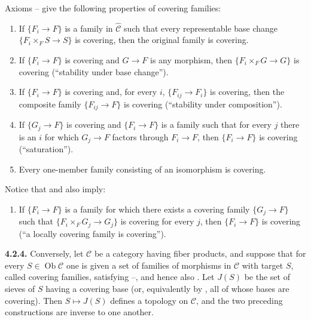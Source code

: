 Axioms -- give the following properties of covering
families:
\begin{enumerate}
 \item[(C 0)] If \(\{F_i\to F\}\) is a family in
 \(\widehat{\mathscr C}\) such that every representable base change
 \(\{F_i\times_FS\to S\}\) is covering, then the original family is
 covering.
 \item[(C 1)] If \(\{F_i\to F\}\) is covering and \(G\to F\) is any
 morphism, then \(\{F_i\times_FG\to G\}\) is covering (``stability under
 base change'').
 \item[(C 2)] If \(\{F_i\to F\}\) is covering and, for every \(i\),
 \(\{F_{ij}\to F_i\}\) is covering, then the composite family
 \(\{F_{ij}\to F\}\) is covering (``stability under composition'').
 \item[(C 3)] If \(\{G_j\to F\}\) is covering and \(\{F_i\to F\}\) is
 a family such that for every \(j\) there is an \(i\) for which
 \(G_j\to F\) factors through \(F_i\to F\), then \(\{F_i\to F\}\) is
 covering (``saturation'').
 \item[(C 4)] Every one-member family consisting of an isomorphism is
 covering.
\end{enumerate}
Notice that  and  also imply:
\begin{enumerate}
 \item[(C 5)] If \(\{F_i\to F\}\) is a family for which there exists a
 covering family \(\{G_j\to F\}\) such that
 \(\{F_i\times_FG_j\to G_j\}\) is covering for every \(j\), then
 \(\{F_i\to F\}\) is covering (``a locally covering family is
 covering'').
\end{enumerate}

\medskip
\noindent{}\textbf{4.2.4.}
Conversely, let \(\mathscr C\) be a category having fiber products, and
suppose that for every \(S\in\operatorname{Ob}\mathscr C\) one is given a
set of families of morphisms in \(\mathscr C\) with target \(S\), called
covering families, satisfying --, and hence also . Let
\(J(S)\) be the set of sieves of \(S\) having a covering base (or,
equivalently by , all of whose bases are covering). Then
\(S\mapsto J(S)\) defines a topology on \(\mathscr C\), and the two
preceding constructions are inverse to one another.

